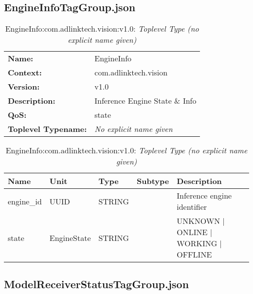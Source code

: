 \subsection{EngineInfoTagGroup.json}

\begin{table}[H]
\begin{tabularx}{\textwidth}{l X} 
       \textbf{Name:} & EngineInfo \\ 
	   \textbf{Context:} & com.adlinktech.vision \\ 
	   \textbf{Version:} & v1.0 \\ 
	   \textbf{Description:} & Inference Engine State \& Info \\ 
	   \textbf{QoS:} & state \\
	   \textbf{Toplevel Typename:} & \textit{No explicit name given} \\ 
\end{tabularx}
\caption{EngineInfo:com.adlinktech.vision:v1.0}\label{EngineInfoTagGroup.json:table:EngineInfo}
\bigskip
\begin{tabularx}{\textwidth}{l l l l X} 
	 \textbf{Name} & \textbf{Unit} & \textbf{Type} & \textbf{Subtype} & \textbf{Description} \\
	 \midrule
   engine\_id & UUID & STRING &  & Inference engine identifier \\
   state & EngineState & STRING &  & UNKNOWN | ONLINE | WORKING | OFFLINE \\
\end{tabularx}
\caption{EngineInfo:com.adlinktech.vision:v1.0: \textit{Toplevel Type (no explicit name given)}}\label{EngineInfoTagGroup.json:table:EngineInfo-no-type-given}


\end{table}

\subsection{ModelReceiverStatusTagGroup.json}

